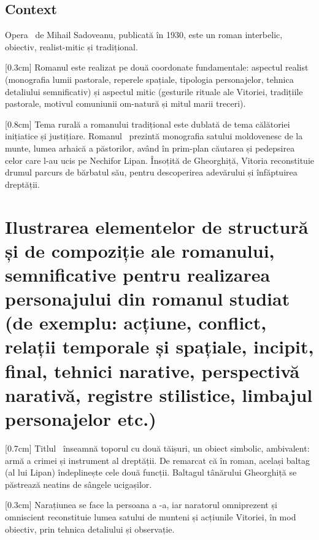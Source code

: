 \renewcommand{\operatitle}{\textbfit{„Baltagul”}} %
\renewcommand{\operaauthor}{Mihail Sadoveanu} %


\subsection{Context}

Opera \operatitle\ de \operaauthor, publicată în 1930, este un roman interbelic, obiectiv, realist-mitic și tradițional.

[0.3cm]
Romanul este realizat pe două coordonate fundamentale: aspectul realist (monografia lumii pastorale, reperele spațiale, tipologia personajelor, tehnica detaliului semnificativ) și aspectul mitic (gesturile rituale ale Vitoriei, tradițiile pastorale, motivul comuniunii om-natură și mitul marii treceri).

[0.8cm]
Tema rurală a romanului tradițional este dublată de tema călătoriei inițiatice și justițiare. Romanul \operatitle\ prezintă monografia satului moldovenesc de la munte, lumea arhaică a păstorilor, având în prim-plan căutarea și pedepsirea celor care l-au ucis pe Nechifor Lipan. Însoțită de Gheorghiță, Vitoria reconstituie drumul parcurs de bărbatul său, pentru descoperirea adevărului și înfăptuirea dreptății.


\section{Ilustrarea elementelor de structură și de compoziție ale romanului, semnificative pentru realizarea personajului din romanul studiat {\footnotesize\normalfont (de exemplu: acțiune, conflict, relații temporale și spațiale, incipit, final, tehnici narative, perspectivă narativă, registre stilistice, limbajul personajelor etc.)}}

[0.7cm]
Titlul \operatitle\ înseamnă toporul cu două tăișuri, un obiect simbolic, ambivalent: armă a crimei și instrument al dreptății. De remarcat că în roman, același baltag (al lui Lipan) îndeplinește cele două funcții. Baltagul tânărului Gheorghiță se păstrează neatins de sângele ucigașilor.

[0.3cm]
Narațiunea se face la persoana a -a, iar naratorul omniprezent și omniscient reconstituie lumea satului de munteni și acțiunile Vitoriei, în mod obiectiv, prin tehnica detaliului și observație.


